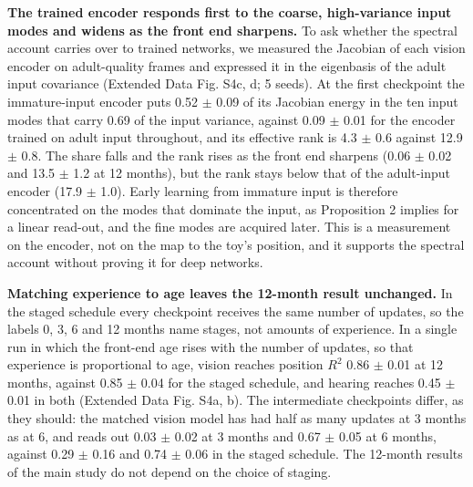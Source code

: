 \documentclass{article}
\begin{document}
\textbf{The trained encoder responds first to the coarse, high-variance input modes and widens as the front end sharpens.} To ask whether the spectral account carries over to trained networks, we measured the Jacobian of each vision encoder on adult-quality frames and expressed it in the eigenbasis of the adult input covariance (Extended Data Fig. S4c, d; 5 seeds). At the first checkpoint the immature-input encoder puts 0.52 \ensuremath{\pm} 0.09 of its Jacobian energy in the ten input modes that carry 0.69 of the input variance, against 0.09 \ensuremath{\pm} 0.01 for the encoder trained on adult input throughout, and its effective rank is 4.3 \ensuremath{\pm} 0.6 against 12.9 \ensuremath{\pm} 0.8. The share falls and the rank rises as the front end sharpens (0.06 \ensuremath{\pm} 0.02 and 13.5 \ensuremath{\pm} 1.2 at 12 months), but the rank stays below that of the adult-input encoder (17.9 \ensuremath{\pm} 1.0). Early learning from immature input is therefore concentrated on the modes that dominate the input, as Proposition 2 implies for a linear read-out, and the fine modes are acquired later. This is a measurement on the encoder, not on the map to the toy's position, and it supports the spectral account without proving it for deep networks.

\textbf{Matching experience to age leaves the 12-month result unchanged.} In the staged schedule every checkpoint receives the same number of updates, so the labels 0, 3, 6 and 12 months name stages, not amounts of experience. In a single run in which the front-end age rises with the number of updates, so that experience is proportional to age, vision reaches position \(R^2\) 0.86 \ensuremath{\pm} 0.01 at 12 months, against 0.85 \ensuremath{\pm} 0.04 for the staged schedule, and hearing reaches 0.45 \ensuremath{\pm} 0.01 in both (Extended Data Fig. S4a, b). The intermediate checkpoints differ, as they should: the matched vision model has had half as many updates at 3 months as at 6, and reads out 0.03 \ensuremath{\pm} 0.02 at 3 months and 0.67 \ensuremath{\pm} 0.05 at 6 months, against 0.29 \ensuremath{\pm} 0.16 and 0.74 \ensuremath{\pm} 0.06 in the staged schedule. The 12-month results of the main study do not depend on the choice of staging.
\end{document}
